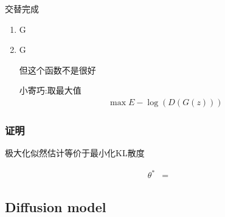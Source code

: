 交替完成
\begin{enumerate}
    \item G
    \item G
    
    \subitem 但这个函数不是很好

    \subitem 小寄巧:取最大值
    \begin{align*}
        \max E -\log(D(G(z)))
    \end{align*}
\end{enumerate}

\subsubsection{证明}

极大化似然估计等价于最小化KL散度

\begin{align*}
    \theta^*&=
\end{align*}


\subsection{Diffusion model}